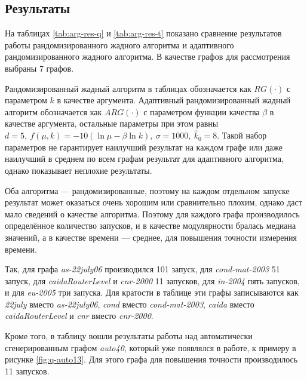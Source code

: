 
\subsection{Результаты}
\label{subsec:arg-res}

На таблицах \ref{tab:arg-res-q} и \ref{tab:arg-res-t} показано сравнение результатов работы рандомизированного жадного алгоритма и адаптивного рандомизированного жадного алгоритма. В качестве графов для рассмотрения выбраны 7 графов.

Рандомизированный жадный алгоритм в таблицах обозначается как $RG(\cdot)$ с параметром $k$ в качестве аргумента. Адаптивный рандомизированный жадный алгоритм обозначается как $ARG(\cdot)$ с параметром функции качества $\beta$ в качестве аргумента, остальные параметры при этом равны $d = 5,\ f(\mu, k) = -10 (\ln \mu - \beta \ln k),\ \sigma = 1000,\ \hat{k}_0 = 8$. Такой набор параметров не гарантирует наилучший результат на каждом графе или даже наилучший в среднем по всем графам результат для адаптивного алгоритма, однако показывает неплохие результаты.

Оба алгоритма --- рандомизированные, поэтому на каждом отдельном запуске результат может оказаться очень хорошим или сравнительно плохим, однако даст мало сведений о качестве алгоритма. Поэтому для каждого графа производилось определённое количество запусков, и в качестве модулярности бралась медиана значений, а в качестве времени --- среднее, для повышения точности измерения времени.

Так, для графа \emph{as-22july06} производился 101 запуск, для \emph{cond-mat-2003} 51 запуск, для \emph{caidaRouterLevel} и \emph{cnr-2000} 11 запусков, для \emph{in-2004} пять запусков, и для \emph{eu-2005} три запуска. Для кратости в таблице эти графы записываются как \emph{22july} вместо \emph{as-22july06}, \emph{cond} вместо \emph{cond-mat-2003}, \emph{caida} вместо \emph{caidaRouterLevel} и \emph{cnr} вместо \emph{cnr-2000}.

Кроме того, в таблицу вошли результаты работы над автоматически сгенерированным графом \emph{auto40}, который уже появлялся в работе, к примеру в рисунке \ref{fig:q-auto13}. Для этого графа для повышения точности производилось 11 запусков.


